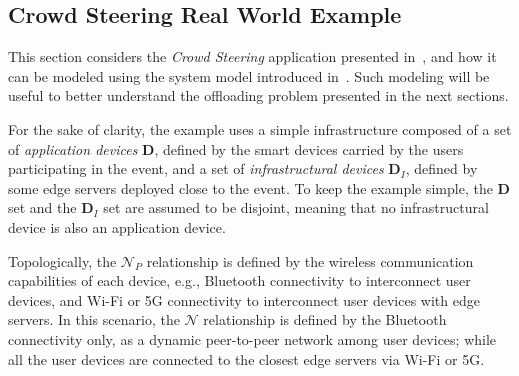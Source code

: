 \subsection{Crowd Steering Real World Example}\label{sec:crowd-steering-example}

This section considers the \emph{Crowd Steering} application presented in~,
 and how it can be modeled using the system model introduced in~.
%
Such modeling will be useful to better understand the offloading problem presented in the next sections.

For the sake of clarity,
 the example uses a simple infrastructure composed of a set of \emph{application devices} $\mathbf{D}$,
 defined by the smart devices carried by the users participating in the event,
 and a set of \emph{infrastructural devices} $\mathbf{D}_I$,
 defined by some edge servers deployed close to the event.
%
To keep the example simple,
 the $\mathbf{D}$ set and the $\mathbf{D}_I$ set are assumed to be disjoint,
 meaning that no infrastructural device is also an application device.

Topologically,
 the $\mathcal{N}_P$ relationship is defined by the wireless communication capabilities of each device,
 e.g., Bluetooth connectivity to interconnect user devices,
 and Wi-Fi or 5G connectivity to interconnect user devices with edge servers.
%
In this scenario,
 the $\mathcal{N}$ relationship is defined by the Bluetooth connectivity only,
 as a dynamic peer-to-peer network among user devices;
 while all the user devices are connected to the closest edge servers via Wi-Fi or 5G.

\newcommand{\PositionSensor}{\ensuremath{\mathtt{C}_\sigma}}
\newcommand{\DensityEstimation}{\ensuremath{\mathtt{C}_\rho}}
\newcommand{\Router}{\ensuremath{\mathtt{C}_\kappa}}
\newcommand{\GuidanceActuator}{\ensuremath{\mathtt{C}_\alpha}}
\newcommand{\port}[1]{\ensuremath{\mathtt{p}_#1}}
\newcommand{\ComponentsList}{\ensuremath{\overline{\mathtt{C}}}}
\newcommand{\BindingsList}{\ensuremath{\overline{\mathtt{B}}}}
\newcommand{\binding}[1]{\ensuremath{\mathtt{B}_#1}}

